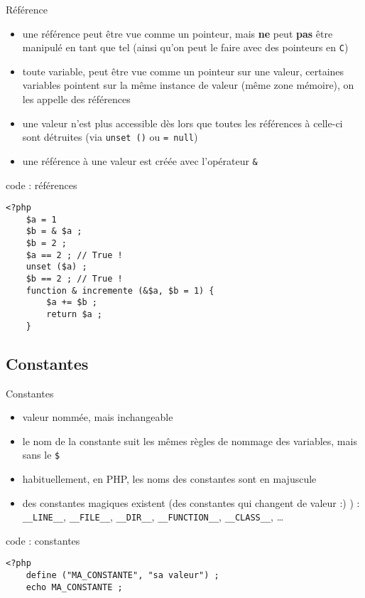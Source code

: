\begin{frame}[containsverbatim]{Référence}
\begin{itemize}
\item une référence peut être vue comme un pointeur, mais \textbf{ne} peut \textbf{pas} être manipulé en tant que tel (ainsi qu'on peut le faire avec des pointeurs en \texttt{C})
\item toute variable, peut être vue comme un pointeur sur une valeur, certaines variables pointent sur la même instance de valeur (même zone mémoire), on les appelle des références
\item une valeur n'est plus accessible dès lors que toutes les références à celle-ci sont détruites (via \texttt{unset ()} ou \texttt{= null})
\item une référence à une valeur est créée avec l'opérateur \texttt{\&}
\end{itemize}
\begin{block}{code : références}
\begin{lstlisting}
<?php
	$a = 1
	$b = & $a ;
	$b = 2 ;
	$a == 2 ; // True !
	unset ($a) ;
	$b == 2 ; // True !
	function & incremente (&$a, $b = 1) {
		$a += $b ;
		return $a ;
	}
\end{lstlisting}
\end{block}
\end{frame}

\subsection{Constantes}

\begin{frame}[containsverbatim]{Constantes}
\begin{itemize}
	\item valeur nommée, mais inchangeable
	\item le nom de la constante suit les mêmes règles de nommage des variables, mais sans le \texttt{\$}
	\item habituellement, en PHP, les noms des constantes sont en majuscule
	\item des constantes magiques existent (des constantes qui changent de valeur :) ) : \texttt{\_\_LINE\_\_}, \texttt{\_\_FILE\_\_}, \texttt{\_\_DIR\_\_}, \texttt{\_\_FUNCTION\_\_}, \texttt{\_\_CLASS\_\_}, \ldots
\end{itemize}
\begin{block}{code : constantes}
\begin{lstlisting}
<?php
	define ("MA_CONSTANTE", "sa valeur") ;
	echo MA_CONSTANTE ;
\end{lstlisting}
\end{block}
\end{frame}

